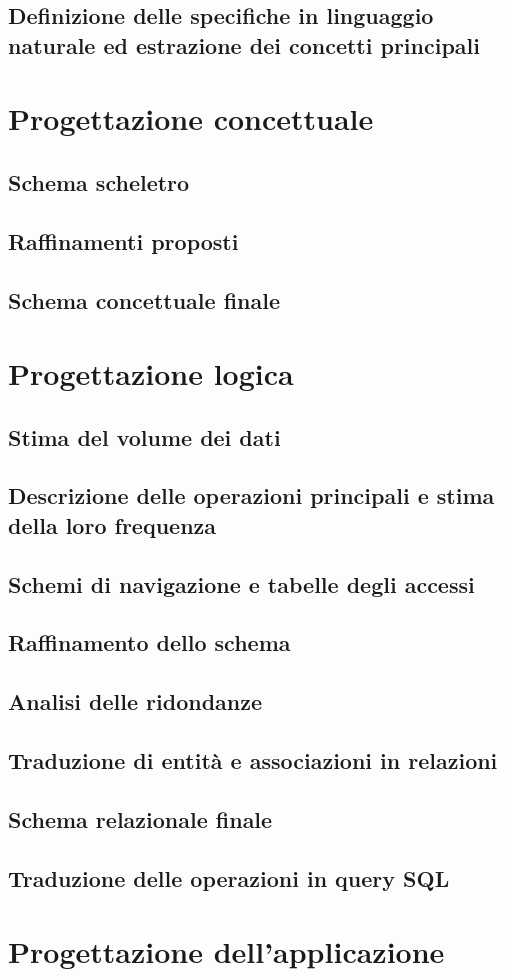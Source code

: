 \documentclass[a4paper,12pt]{report}
\begin{document}
\section{Definizione delle specifiche in linguaggio naturale ed estrazione dei concetti principali}
\newpage
\chapter{Progettazione concettuale}
\section{Schema scheletro}
\section{Raffinamenti proposti}
\section{Schema concettuale finale}
\newpage
\chapter{Progettazione logica}
\section{Stima del volume dei dati}
\section{Descrizione delle operazioni principali e stima della loro frequenza}
\section{Schemi di navigazione e tabelle degli accessi}
\section{Raffinamento dello schema}
\section{Analisi delle ridondanze}
\section{Traduzione di entità e associazioni in relazioni}
\section{Schema relazionale finale}
\section{Traduzione delle operazioni in query SQL}
\newpage
\chapter{Progettazione dell'applicazione}
\end{document}
